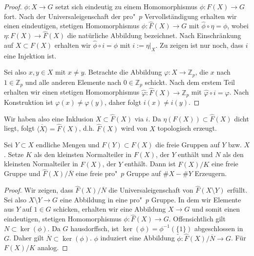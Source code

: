 \documentclass[11pt,a4paper,openany]{memoir}
\begin{document}
\begin{proof}
$\phi:X\to G$ setzt sich eindeutig zu einem Homomorphismus $\phi:F(X)\to G$ fort. Nach der Universaleigenschaft der pro"~$p$ Vervollständigung erhalten wir einen eindeutigen, stetigen Homomorphismus $\widehat{\phi}:\widehat{F}(X)\to G$ mit $\widehat{\phi}\circ\eta = \phi$, wobei $\eta: F(X)\to\widehat{F}(X)$ die natürliche Abbildung bezeichnet. Nach Einschränkung auf $X\subset F(X)$ erhalten wir $\widehat{\phi}\circ i=\phi$ mit $i:=\eta|_X$. Zu zeigen ist nur noch, dass $i$ eine Injektion ist.

Sei also $x,y\in X$ mit $x\neq y$. Betrachte die Abbildung $\varphi:X\to\mathbb{Z}_p$, die $x$ nach $1\in\mathbb{Z}_p$ und alle anderen Elemente nach $0\in\mathbb{Z}_p$ schickt. Nach dem erstem Teil erhalten wir einen stetigen Homomorphismus $\widehat{\varphi}:\widehat{F}(X)\to\mathbb{Z}_p$ mit $\widehat{\varphi}\circ i=\varphi$. Nach Konstruktion ist $\varphi(x)\neq\varphi(y)$, daher folgt $i(x)\neq i(y)$.
\end{proof}

\begin{remark}
Wir haben also eine Inklusion $X\subset \widehat{F}(X)$ via $i$. Da $\eta(F(X))\subset\widehat{F}(X)$ dicht liegt, folgt $\overline{\langle X\rangle}=\widehat{F}(X)$, d.h. $\widehat{F}(X)$ wird von $X$ topologisch erzeugt.
\end{remark}

\iffalse
\begin{proposition}\label{prop:freepropgroup2}
Sei $Y\subset X$ endliche Mengen und $F(Y)\subset F(X)$ die freie Gruppen auf $Y$ bzw. $X$. Setze $K$ als den kleinsten Normalteiler in $F(X)$, der $Y$ enthält und $N$ als den kleinsten Normalteiler in $\widehat{F}(X)$, der $Y$ enthält. Dann ist $F(X)/K$ eine freie Gruppe und $\widehat{F}(X)/\overline{N}$ eine freie pro"~$p$ Gruppe auf $\#X-\#Y$ Erzeugern.
\end{proposition}

\begin{proof}
Wir zeigen, dass $\widehat{F}(X)/\overline{N}$ die Universaleigenschaft von $\widehat{F}(X\setminus Y)$ erfüllt. Sei also $X\setminus Y\to G$ eine Abbildung in eine pro"~$p$ Gruppe. In dem wir Elemente aus $Y$ auf $1\in G$ schicken, erhalten wir eine Abbildung $X\to G$ und somit einen eindeutigen, stetigen Homomorphismus $\phi:\widehat{F}(X)\to G$. Offensichtlich gilt $N\subset\ker(\phi)$. Da $G$ hausdorffsch, ist $\ker(\phi)= \phi^{-1}(\{1\})$ abgeschlossen in $G$. Daher gilt $\overline{N}\subset\ker(\phi)$. $\phi$ induziert eine Abbildung $\tilde{\phi}:\widehat{F}(X)/\overline{N}\to G$. Für $F(X)/K$ analog.
\end{proof}
\end{document}
